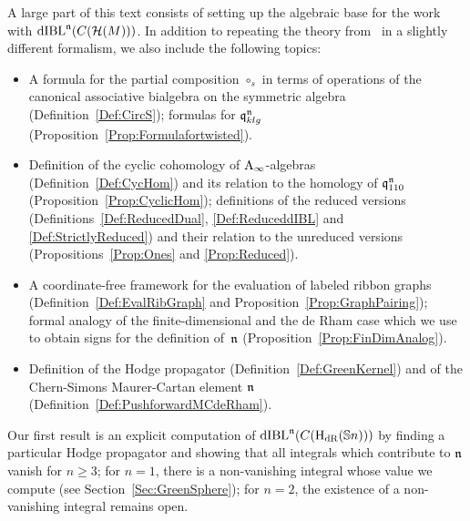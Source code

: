 \documentclass[\MainFolder/Text.tex]{subfiles}
\begin{document}
A large part of this text consists of setting up the algebraic base for the work with $\mathrm{dIBL}^{\mathfrak{n}}(C(\mathcal{H}(M)))$. In addition to repeating the theory from~\cite{Cieliebak2015} in a slightly different formalism, we also include the following topics:

\begin{itemize}
\item A formula for the partial composition $\circ_s$ in terms of operations of the canonical associative bialgebra on the symmetric algebra (Definition~\ref{Def:CircS}); formulas for $\mathfrak{q}_{klg}^{\mathfrak{n}}$ (Proposition~\ref{Prop:Formulafortwisted}).
\item Definition of the cyclic cohomology of $\mathrm{A}_\infty$-algebras (Definition~\ref{Def:CycHom}) and its relation to the homology of $\mathfrak{q}_{110}^{\mathfrak{n}}$ (Proposition~\ref{Prop:CyclicHom}); definitions of the reduced versions (Definitions~\ref{Def:ReducedDual}, \ref{Def:ReduceddIBL} and \ref{Def:StrictlyReduced}) and their relation to the unreduced versions (Propositions~\ref{Prop:Ones} and \ref{Prop:Reduced}).
\item A coordinate-free framework for the evaluation of labeled ribbon graphs (Definition~\ref{Def:EvalRibGraph} and Proposition~\ref{Prop:GraphPairing}); formal analogy of the finite-dimensional and the de Rham case which we use to obtain signs for the definition of~$\mathfrak{n}$ (Proposition~\ref{Prop:FinDimAnalog}).
\item Definition of the Hodge propagator (Definition~\ref{Def:GreenKernel}) and of the Chern-Simons Maurer-Cartan element $\mathfrak{n}$ (Definition~\ref{Def:PushforwardMCdeRham}). 
\end{itemize}

Our first result is an explicit computation of $\mathrm{dIBL}^{\mathfrak{n}}(C(\mathrm{H}_{\mathrm{dR}}({\mathbb{S}{n}})))$ by finding a particular Hodge propagator and showing that all integrals which contribute to $\mathfrak{n}$ vanish for $n\ge 3$; for $n=1$, there is a non-vanishing integral whose value we compute (see Section~\ref{Sec:GreenSphere}); for $n=2$, the existence of a non-vanishing integral remains open.
\end{document}
